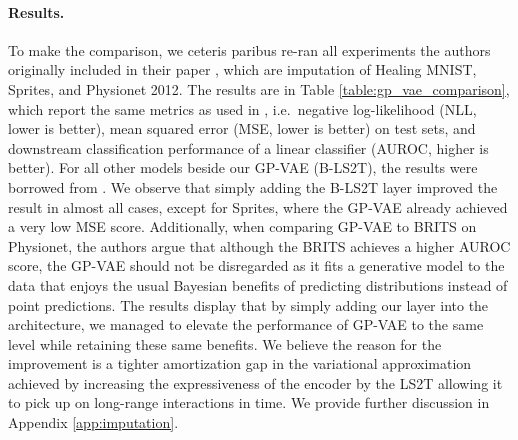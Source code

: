 \documentclass{article} \usepackage{iclr2021_conference,times}
\theoremstyle{plain}
\theoremstyle{definition}
\begin{document}
\paragraph{Results.}
To make the comparison, we ceteris paribus re-ran all experiments the authors originally included in their paper \citep{fortuin2019gpvae}, which are imputation of Healing MNIST, Sprites, and Physionet 2012.
The results are in Table \ref{table:gp_vae_comparison}, which report the same metrics as used in \citet{fortuin2019gpvae}, i.e.~negative log-likelihood (NLL, lower is better), mean squared error (MSE, lower is better) on test sets, and downstream classification performance of a linear classifier (AUROC, higher is better). For all other models beside our GP-VAE (B-LS2T), the results were borrowed from \citet{fortuin2019gpvae}. We observe that simply adding the B-LS2T layer improved the result in almost all cases, except for Sprites, where the GP-VAE already achieved a very low MSE score. Additionally, when comparing GP-VAE to BRITS on Physionet, the authors argue that although the BRITS achieves a higher AUROC score, the GP-VAE should not be disregarded as it fits a generative model to the data that enjoys the usual Bayesian benefits of predicting distributions instead of point predictions. The results display that by simply adding our layer into the architecture, we managed to elevate the performance of GP-VAE to the same level while retaining these same benefits. We believe the reason for the improvement is a tighter amortization gap in the variational approximation \citep{Cremer2018inference} achieved by increasing the expressiveness of the encoder by the LS2T allowing it to pick up on long-range interactions in time. We provide further discussion in Appendix \ref{app:imputation}.
\end{document}
